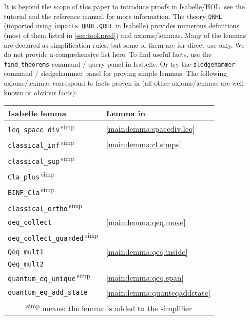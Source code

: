 \documentclass{article}
\newcommand\qrhlautorefx[1]{\autoref*{main:#1}}
\begin{document}
It is
beyond the scope of this paper to introduce proofs in Isabelle/HOL,
see the tutorial \cite{isabelle-tutorial} and the
reference manual \cite{isar-ref} for more information. The theory
\texttt{QRHL} (imported using \texttt{imports QRHL.QRHL} in Isabelle) provides numerous definitions (most of them listed in
\autoref{sec:tool.pred}) and axioms/lemmas. Many of the lemmas are
declared as simplification rules, but some of them are for direct use
only. We do not provide a comprehensive list here. To find useful
facts, use the \texttt{find\_theorems} command \cite{isar-ref} / query panel \cite{isabelle-jedit} in Isabelle. Or try the \texttt{sledgehammer} command
\cite{isar-ref} / sledgehammer panel \cite{isabelle-jedit} for proving simple lemmas.  The following
axioms/lemmas correspond to facts proven in \cite{qrhl-paper-from-manual} (all other axioms/lemmas are
well-known or obvious facts):
\begin{center}
\begin{tabular}{|ll|}
  \hline
  \bfseries Isabelle lemma
  &
    \bfseries Lemma in \cite{qrhl-paper-from-manual}
  \\
  \hline
  \hline
  \texttt{leq\_space\_div}\,\textsuperscript{simp} & \qrhlautorefx{lemma:spacediv.leq} \\
  \hline
  \texttt{classical\_inf}\,\textsuperscript{simp} & \qrhlautorefx{lemma:cl.simps} \\
  \texttt{classical\_sup}\,\textsuperscript{simp} &\\
  \texttt{Cla\_plus}\,\textsuperscript{simp} &\\
  \texttt{BINF\_Cla}\,\textsuperscript{simp} &\\
  \texttt{classical\_ortho}\,\textsuperscript{simp} &\\
  \hline
  \texttt{qeq\_collect} & \qrhlautorefx{lemma:qeq.move} \\
  \texttt{qeq\_collect\_guarded}\,\textsuperscript{simp} & \\
  \hline
  \texttt{Qeq\_mult1} & \qrhlautorefx{lemma:qeq.inside} \\
  \texttt{Qeq\_mult2} & \\
  \hline
  \texttt{quantum\_eq\_unique}\,\textsuperscript{simp} & \qrhlautorefx{lemma:qeq.span} \\
  \hline
  \texttt{quantum\_eq\_add\_state} & \qrhlautorefx{lemma:quanteqaddstate} \\
  \hline
  \hline
  \multicolumn{2}{|c|}{\textsuperscript{simp} means: the lemma is added to the simplifier} \\
  \hline
\end{tabular}
\end{center}
\end{document}
